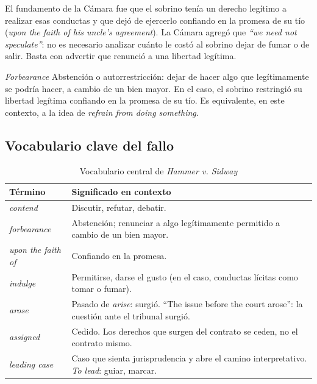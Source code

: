 \documentclass[12pt,oneside]{book}
\begin{document}
El fundamento de la Cámara fue que el sobrino tenía un derecho legítimo a realizar esas conductas y que dejó de ejercerlo confiando en la promesa de su tío (\textit{upon the faith of his uncle's agreement}). La Cámara agregó que \textit{``we need not speculate''}: no es necesario analizar cuánto le costó al sobrino dejar de fumar o de salir. Basta con advertir que renunció a una libertad legítima.

\begin{definition}{\textit{Forbearance}}
Abstención o autorrestricción: dejar de hacer algo que legítimamente se podría hacer, a cambio de un bien mayor. En el caso, el sobrino restringió su libertad legítima confiando en la promesa de su tío. Es equivalente, en este contexto, a la idea de \textit{refrain from doing something}.
\end{definition}

\subsection{Vocabulario clave del fallo}

\begin{table}[H]
\centering
\caption{Vocabulario central de \textit{Hammer v. Sidway}}
\begin{tabularx}{\textwidth}{>{\raggedright\arraybackslash}p{} >{\raggedright\arraybackslash}X}
\toprule
\textbf{Término} & \textbf{Significado en contexto} \\
\midrule
\textit{contend} & Discutir, refutar, debatir. \\
\textit{forbearance} & Abstención; renunciar a algo legítimamente permitido a cambio de un bien mayor. \\
\textit{upon the faith of} & Confiando en la promesa. \\
\textit{indulge} & Permitirse, darse el gusto (en el caso, conductas lícitas como tomar o fumar). \\
\textit{arose} & Pasado de \textit{arise}: surgió. ``The issue before the court arose'': la cuestión ante el tribunal surgió. \\
\textit{assigned} & Cedido. Los derechos que surgen del contrato se ceden, no el contrato mismo. \\
\textit{leading case} & Caso que sienta jurisprudencia y abre el camino interpretativo. \textit{To lead}: guiar, marcar. \\
\bottomrule
\end{tabularx}
\end{table}
\end{document}
